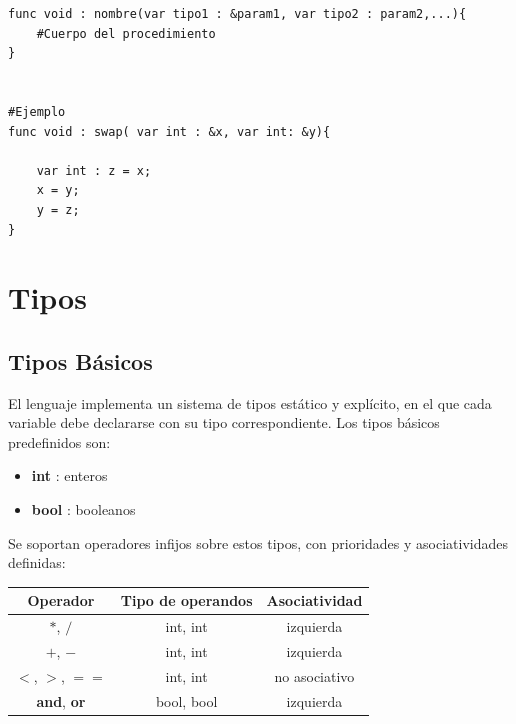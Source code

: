 \documentclass[12pt,a4paper]{article}
\begin{document}
\begin{lstlisting}
func void : nombre(var tipo1 : &param1, var tipo2 : param2,...){
    #Cuerpo del procedimiento
}


#Ejemplo
func void : swap( var int : &x, var int: &y){

    var int : z = x;
    x = y;
    y = z;
}
\end{lstlisting}




\section{Tipos}

\subsection{Tipos Básicos}

El lenguaje implementa un sistema de tipos estático y explícito, en el que cada variable debe declararse con su tipo correspondiente.  
Los tipos básicos predefinidos son:

\begin{itemize}
    \item \textbf{int} : enteros
    \item \textbf{bool} : booleanos
\end{itemize}

Se soportan operadores infijos sobre estos tipos, con prioridades y asociatividades definidas:

\begin{center}
\begin{tabular}{|c|c|c|}
\hline
Operador & Tipo de operandos & Asociatividad \\
\hline
$*$, $/$ & int, int & izquierda \\
$+$, $-$ & int, int & izquierda \\
$<$, $>$, $==$ & int, int & no asociativo \\
\textbf{and}, \textbf{or} & bool, bool & izquierda \\
\hline
\end{tabular}
\end{center}




\end{document}

